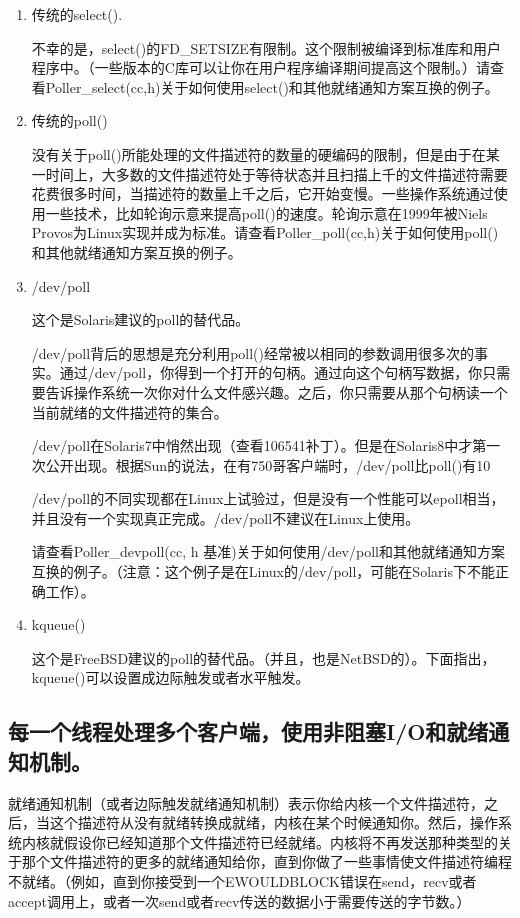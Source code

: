 \documentclass[12pt, twoside, a4paper, xetex]{report}
\begin{document}
	\begin{enumerate}
	
	\item 传统的select().
	
	不幸的是，select()的FD\_SETSIZE有限制。这个限制被编译到标准库和用户程序中。（一些版本的C库可以让你在用户程序编译期间提高这个限制。）请查看Poller\_select(cc,h)关于如何使用select()和其他就绪通知方案互换的例子。
	
	\item 传统的poll()
	
	没有关于poll()所能处理的文件描述符的数量的硬编码的限制，但是由于在某一时间上，大多数的文件描述符处于等待状态并且扫描上千的文件描述符需要花费很多时间，当描述符的数量上千之后，它开始变慢。一些操作系统通过使用一些技术，比如轮询示意来提高poll()的速度。轮询示意在1999年被Niels Provos为Linux实现并成为标准。请查看Poller\_poll(cc,h)关于如何使用poll()和其他就绪通知方案互换的例子。
	
	\item /dev/poll
	
	这个是Solaris建议的poll的替代品。
	
	/dev/poll背后的思想是充分利用poll()经常被以相同的参数调用很多次的事实。通过/dev/poll，你得到一个打开的句柄。通过向这个句柄写数据，你只需要告诉操作系统一次你对什么文件感兴趣。之后，你只需要从那个句柄读一个当前就绪的文件描述符的集合。
	
	/dev/poll在Solaris7中悄然出现（查看106541补丁）。但是在Solaris8中才第一次公开出现。根据Sun的说法，在有750哥客户端时，/dev/poll比poll()有10%
	
	/dev/poll的不同实现都在Linux上试验过，但是没有一个性能可以epoll相当，并且没有一个实现真正完成。/dev/poll不建议在Linux上使用。
	
	请查看Poller\_devpoll(cc, h 基准)关于如何使用/dev/poll和其他就绪通知方案互换的例子。（注意：这个例子是在Linux的/dev/poll，可能在Solaris下不能正确工作）。
	\item kqueue()
	
	这个是FreeBSD建议的poll的替代品。（并且，也是NetBSD的）。下面指出，kqueue()可以设置成边际触发或者水平触发。
	
	\end{enumerate}
	
\subsection*{每一个线程处理多个客户端，使用非阻塞I/O和就绪通知机制。}

	就绪通知机制（或者边际触发就绪通知机制）表示你给内核一个文件描述符，之后，当这个描述符从没有就绪转换成就绪，内核在某个时候通知你。然后，操作系统内核就假设你已经知道那个文件描述符已经就绪。内核将不再发送那种类型的关于那个文件描述符的更多的就绪通知给你，直到你做了一些事情使文件描述符编程不就绪。（例如，直到你接受到一个EWOULDBLOCK错误在send，recv或者accept调用上，或者一次send或者recv传送的数据小于需要传送的字节数。）
	
\end{document}
